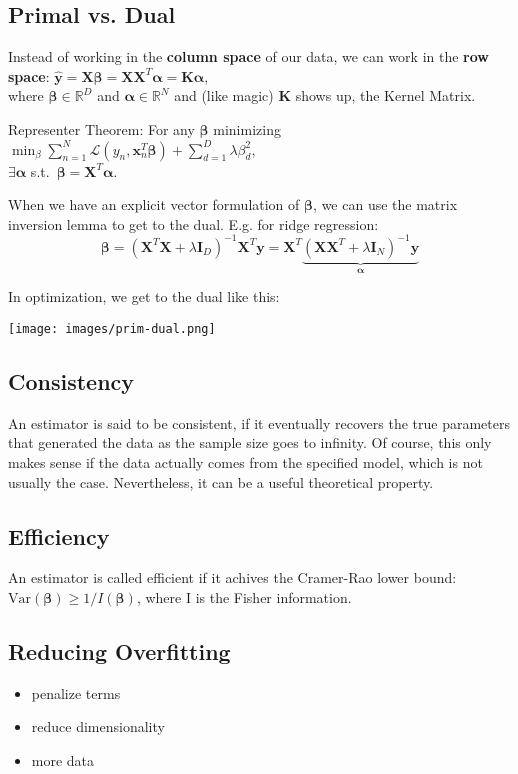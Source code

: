 \documentclass[10pt,a4paper,landscape]{article}
\renewcommand{\bf}[1]{\ensuremath{\mathbf{#1}}}
\newcommand{\Var}{\mathrm{Var}}
\newcommand{\balpha}{\boldsymbol\alpha}
\newcommand{\bbeta}{\boldsymbol\beta}
\newcommand{\st}{s.t.}
\begin{document}
\begin{multicols*}{4}
\subsection{Primal vs. Dual}
Instead of working in the \textbf{column space} of our data, we can work in the \textbf{row space}:
$\hat{\bf{y}} = \bf{X} \bbeta = \bf{X X}^T \balpha = \bf{K} \balpha$,\\
where $\bbeta \in \mathbb{R}^D$ and $\balpha \in \mathbb{R}^N$
and (like magic) $\bf{K}$ shows up, the Kernel Matrix.

Representer Theorem: For any $\bbeta$ minimizing
$\min_\beta \sum_{n=1}^N \mathcal{L}(y_n, \bf{x}_n^T \bbeta) + \sum_{d=1}^D \lambda \beta_d^2$,\\
$\exists \balpha$ \st\ $\bbeta = \bf{X}^T \balpha$.

When we have an explicit vector formulation of $\bbeta$, we can use the matrix inversion lemma to get to the dual. E.g. for ridge regression:
$$\bbeta = (\bf{X}^T \bf{X}  + \lambda \bf{I}_D)^{-1} \bf{X}^T \bf{y}= \bf{X}^T \underbrace{(\bf{X X}^T + \lambda \bf{I}_N)^{-1} \bf{y}}_{\balpha}$$

In optimization, we get to the dual like this:
\begin{colfig}
  \centering
  \texttt{[image: images/prim-dual.png]}
\end{colfig}

\subsection{Consistency}
An estimator is said to be consistent, if it eventually recovers the true parameters that generated the data as the sample size goes to infinity. Of course, this only makes sense if the data actually comes from the specified model, which is not usually the case. Nevertheless, it can be a useful theoretical property.

\subsection{Efficiency}
An estimator is called efficient if it achives the Cramer-Rao lower bound:
$\Var{(\bbeta)} \geq 1/I(\bbeta)$, where I is the Fisher information.

\subsection{Reducing Overfitting}
\begin{itemize}[itemsep=0pt]
\item penalize terms
\item reduce dimensionality
\item more data
\end{itemize}


\end{multicols*}
\end{document}
